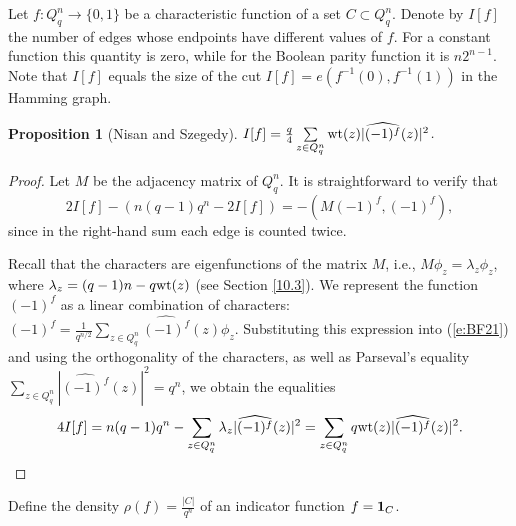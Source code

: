 \documentclass[11pt]{article}
\newtheorem{claim}{Proposition}[section]
\theoremstyle{definition}
\newcommand{\wt}{{\rm wt}}
\begin{document}
{{{Let $f:Q_q^n\rightarrow \{0,1\}$ be a characteristic function of a set $C\subset Q_q^n$. Denote by $I[f]$ the number
of edges whose endpoints have different values of $f$.
For a constant function this quantity is zero, while for the Boolean
parity function it is $n2^{n-1}$. Note that $I[f]$ equals the size of the cut
$I[f]=e(f^{-1}(0), f^{-1}(1))$ in the Hamming graph.

\begin{claim}[Nisan and Szegedy\cite{NiSz}]\label{cl:I}
$I[f]=\frac{q}{4}\sum\limits_{z\in Q_q^n}\wt(z)
|\widehat{(-1)^f}(z)|^2$.
\end{claim}
\begin{proof}
Let $M$ be the adjacency matrix of $Q^n_q$.  It is straightforward to verify that
 \begin{equation}\label{e:BF21}
2I[f]-(n(q-1)q^n-2I[f])=-(M(-1)^f,(-1)^f),
\end{equation}
since in the right-hand sum each edge is counted twice.

Recall that the characters are eigenfunctions of the matrix $M$, i.e.,
$M\phi_z=\lambda_z\phi_z$, where $\lambda_z=(q-1)n-q\wt(z)$
(see Section  \ref{10.3}).
We represent the function $(-1)^f$ as a linear combination of characters:
$(-1)^f=\frac{1}{q^{n/2}}\sum\limits_{z\in
Q_q^n}\widehat{(-1)^f}(z)\phi_z$. Substituting this expression into
(\ref{e:BF21}) and using the orthogonality of the characters, as well as
Parseval's equality $\sum\limits_{z\in
Q_q^n}|\widehat{(-1)^f}(z)|^2=q^n$, we obtain the equalities
$$4I[f]=n(q-1)q^n-\sum\limits_{z\in
Q_q^n}\lambda_z|\widehat{(-1)^f}(z)|^2=\sum\limits_{z\in
Q_q^n}q\wt(z) |\widehat{(-1)^f}(z)|^2.$$
\end{proof}

Define the density $\rho(f)=\frac{|C|}{q^n}$ of an indicator function $f={\bf 1}_C$.

}}}
\end{document}
